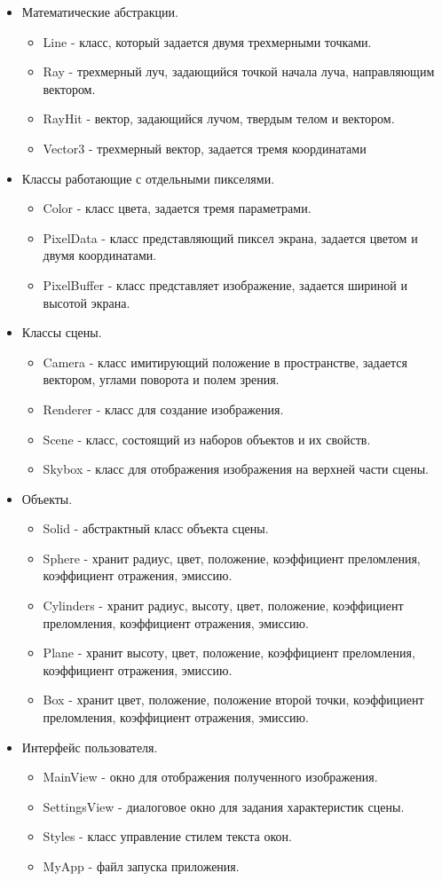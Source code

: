 \begin{itemize}
	\item Математические абстракции.
	\begin{itemize}
		\item Line -  класс, который задается двумя трехмерными точками.
		\item Ray - трехмерный луч, задающийся точкой начала луча, направляющим вектором.
		\item RayHit - вектор, задающийся лучом, твердым телом и вектором.
		\item Vector3 - трехмерный вектор, задается тремя координатами 
	\end{itemize}
	\item Классы работающие с отдельными пикселями.
	\begin{itemize}
		\item Color - класс цвета, задается тремя параметрами.
		\item PixelData - класс представляющий пиксел экрана, задается цветом и двумя координатами.
		\item PixelBuffer - класс представляет изображение, задается шириной и высотой экрана.
	\end{itemize}
	\item Классы сцены.
	\begin{itemize}
		\item Camera - класс имитирующий положение в пространстве, задается вектором, углами поворота и полем зрения.
		\item Renderer - класс для создание изображения.
		\item Scene - класс, состоящий из наборов объектов и их свойств.
		\item Skybox - класс для отображения изображения на верхней части сцены.
	\end{itemize}
	\item Объекты.
	\begin{itemize}
		\item Solid - абстрактный класс объекта сцены.
		\item Sphere - хранит радиус, цвет, положение, коэффициент преломления, коэффициент отражения, эмиссию.
		\item Cylinders - хранит радиус, высоту, цвет, положение, коэффициент преломления, коэффициент отражения, эмиссию.
		\item Plane - хранит высоту, цвет, положение, коэффициент преломления, коэффициент отражения, эмиссию.
		\item Box - хранит цвет, положение, положение второй точки, коэффициент преломления, коэффициент отражения, эмиссию.
	\end{itemize}
	\item Интерфейс пользователя.
	\begin{itemize}
		\item MainView -  окно для отображения полученного изображения.
		\item SettingsView - диалоговое окно для задания характеристик сцены.
		\item Styles - класс управление стилем текста окон.
		\item MyApp - файл запуска приложения.
	\end{itemize}
	
\end{itemize}